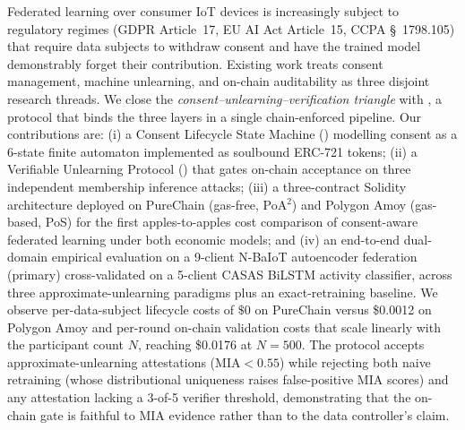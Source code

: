 Federated learning over consumer IoT devices is increasingly subject to
regulatory regimes (GDPR Article~17, EU AI Act Article~15, CCPA
\S~1798.105) that require data subjects to withdraw consent and have
the trained model demonstrably forget their contribution. Existing work
treats consent management, machine unlearning, and on-chain auditability
as three disjoint research threads. We close the
\emph{consent--unlearning--verification triangle} with \sysname, a
protocol that binds the three layers in a single chain-enforced
pipeline. Our contributions are: (i) a Consent Lifecycle State Machine
(\clsm) modelling consent as a 6-state finite automaton implemented as
soulbound ERC-721 tokens; (ii) a Verifiable Unlearning Protocol (\vup)
that gates on-chain acceptance on three independent membership
inference attacks; (iii) a three-contract Solidity architecture
deployed on PureChain (gas-free, PoA$^2$) and Polygon Amoy (gas-based,
PoS) for the first apples-to-apples cost comparison of consent-aware
federated learning under both economic models; and (iv) an end-to-end
dual-domain empirical evaluation on a 9-client N-BaIoT autoencoder
federation (primary) cross-validated on a 5-client CASAS BiLSTM
activity classifier, across three approximate-unlearning paradigms
plus an exact-retraining baseline. We
observe per-data-subject lifecycle costs of $\$0$ on PureChain versus
\$0.0012 on Polygon Amoy and per-round on-chain validation costs that
scale linearly with the participant count $N$, reaching \$0.0176 at
$N=500$. The protocol accepts approximate-unlearning attestations
($\text{MIA}\!<\!0.55$) while rejecting both naive
retraining (whose distributional uniqueness raises false-positive MIA
scores) and any attestation lacking a 3-of-5 verifier threshold,
demonstrating that the on-chain gate is faithful to MIA evidence rather
than to the data controller's claim.
